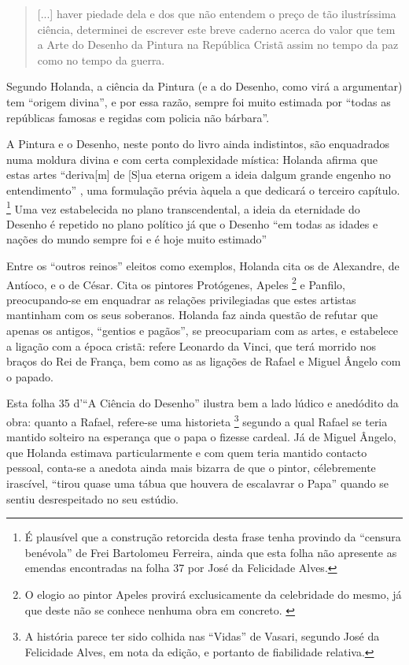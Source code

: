 \documentclass{article}
\begin{document}
\begin{quote}
  [...] haver piedade dela e dos que não entendem o preço de tão
  ilustríssima ciência, determinei de escrever este breve caderno
  acerca do valor que tem a Arte do Desenho da Pintura na República
  Cristã assim no tempo da paz como no tempo da guerra.
\end{quote}

Segundo Holanda, a ciência da Pintura (e a do Desenho, como virá a
argumentar) tem ``origem divina'', e por essa razão, sempre foi muito
estimada por ``todas as repúblicas famosas e regidas com policia não
bárbara''\cite[fl.33r]{holanda}.

A Pintura e o Desenho, neste ponto do livro ainda indistintos, são
enquadrados numa moldura divina e com certa complexidade mística:
Holanda afirma que estas artes ``deriva[m] de [S]ua eterna origem a
ideia dalgum grande engenho no entendimento'' \cite[fl.34r]{holanda},
uma formulação prévia àquela a que dedicará o terceiro
capítulo. \footnote{É plausível que a construção retorcida desta frase
  tenha provindo da ``censura benévola'' de Frei Bartolomeu Ferreira,
  ainda que esta folha não apresente as emendas encontradas na folha
  37 por José da Felicidade Alves.} Uma vez estabelecida no plano
transcendental, a ideia da eternidade do Desenho é repetido no plano
político já que o Desenho ``em todas as idades e nações do mundo
sempre foi e é hoje muito estimado'' \cite[fl.34r]{holanda}

Entre os ``outros reinos'' eleitos como exemplos, Holanda cita os de
Alexandre, de Antíoco, e o de César. Cita os pintores Protógenes,
Apeles \footnote{O elogio ao pintor Apeles provirá exclusicamente da
  celebridade do mesmo, já que deste não se conhece nenhuma obra em
  concreto. \cite{calado}} e Panfilo, preocupando-se em enquadrar as
relações privilegiadas que estes artistas mantinham com os seus
soberanos. Holanda faz ainda questão de refutar que apenas os antigos,
``gentios e pagãos'', se preocupariam com as artes, e estabelece a
ligação com a época cristã: refere Leonardo da Vinci, que terá morrido
nos braços do Rei de França, bem como as as ligações de Rafael e
Miguel Ângelo com o papado.

Esta folha 35 d'``A Ciência do Desenho'' ilustra bem a lado lúdico e
anedódito da obra: quanto a Rafael, refere-se uma
historieta \footnote{A história parece ter sido colhida nas ``Vidas''
  de Vasari, segundo José da Felicidade Alves, em nota da edição, e
  portanto de fiabilidade relativa.} segundo a qual Rafael se teria
mantido solteiro na esperança que o papa o fizesse cardeal. Já de
Miguel Ângelo, que Holanda estimava particularmente e com quem teria
mantido contacto pessoal, conta-se a anedota ainda mais bizarra de que
o pintor, célebremente irascível, ``tirou quase uma tábua que houvera
de escalavrar o Papa'' quando se sentiu desrespeitado no seu estúdio.
\end{document}
